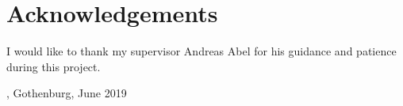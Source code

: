 \thispagestyle{plain}			%
\section*{Acknowledgements}
	I would like to thank my supervisor Andreas Abel for his guidance and 
	patience during this project.

\vspace{1.5cm}
\hfill
\me, Gothenburg, June 2019

\newpage				%
\thispagestyle{empty}
\mbox{}
